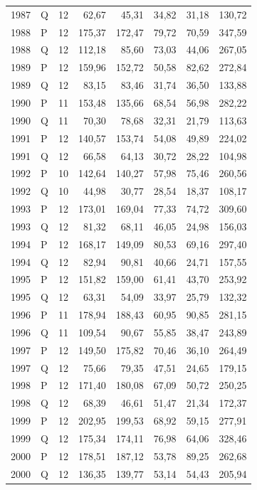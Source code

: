 \documentclass[10pt,a4paper]{article}
\begin{document}
\begin{longtable}{llrrrrrr}
1987 & Q & 12 & 62,67 & 45,31 & 34,82 & 31,18 & 130,72 \\
1988 & P & 12 & 175,37 & 172,47 & 79,72 & 70,59 & 347,59 \\
1988 & Q & 12 & 112,18 & 85,60 & 73,03 & 44,06 & 267,05 \\
1989 & P & 12 & 159,96 & 152,72 & 50,58 & 82,62 & 272,84 \\
1989 & Q & 12 & 83,15 & 83,46 & 31,74 & 36,50 & 133,88 \\
1990 & P & 11 & 153,48 & 135,66 & 68,54 & 56,98 & 282,22 \\
1990 & Q & 11 & 70,30 & 78,68 & 32,31 & 21,79 & 113,63 \\
1991 & P & 12 & 140,57 & 153,74 & 54,08 & 49,89 & 224,02 \\
1991 & Q & 12 & 66,58 & 64,13 & 30,72 & 28,22 & 104,98 \\
1992 & P & 10 & 142,64 & 140,27 & 57,98 & 75,46 & 260,56 \\
1992 & Q & 10 & 44,98 & 30,77 & 28,54 & 18,37 & 108,17 \\
1993 & P & 12 & 173,01 & 169,04 & 77,33 & 74,72 & 309,60 \\
1993 & Q & 12 & 81,32 & 68,11 & 46,05 & 24,98 & 156,03 \\
1994 & P & 12 & 168,17 & 149,09 & 80,53 & 69,16 & 297,40 \\
1994 & Q & 12 & 82,94 & 90,81 & 40,66 & 24,71 & 157,55 \\
1995 & P & 12 & 151,82 & 159,00 & 61,41 & 43,70 & 253,92 \\
1995 & Q & 12 & 63,31 & 54,09 & 33,97 & 25,79 & 132,32 \\
1996 & P & 11 & 178,94 & 188,43 & 60,95 & 90,85 & 281,15 \\
1996 & Q & 11 & 109,54 & 90,67 & 55,85 & 38,47 & 243,89 \\
1997 & P & 12 & 149,50 & 175,82 & 70,46 & 36,10 & 264,49 \\
1997 & Q & 12 & 75,66 & 79,35 & 47,51 & 24,65 & 179,15 \\
1998 & P & 12 & 171,40 & 180,08 & 67,09 & 50,72 & 250,25 \\
1998 & Q & 12 & 68,39 & 46,61 & 51,47 & 21,34 & 172,37 \\
1999 & P & 12 & 202,95 & 199,53 & 68,92 & 59,15 & 277,91 \\
1999 & Q & 12 & 175,34 & 174,11 & 76,98 & 64,06 & 328,46 \\
2000 & P & 12 & 178,51 & 187,12 & 53,78 & 89,25 & 262,68 \\
2000 & Q & 12 & 136,35 & 139,77 & 53,14 & 54,43 & 205,94 \\

\end{longtable}
\end{document}
